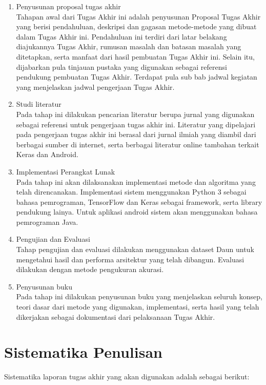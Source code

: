 \begin{enumerate}
\item Penyusunan proposal tugas akhir\\
Tahapan awal dari Tugas Akhir ini adalah penyusunan Proposal Tugas Akhir yang berisi pendahuluan, deskripsi dan gagasan metode-metode yang dibuat dalam Tugas Akhir ini.
Pendahuluan ini terdiri dari latar belakang diajukannya Tugas Akhir, rumusan masalah dan batasan masalah yang ditetapkan, serta manfaat dari hasil pembuatan Tugas Akhir ini. Selain itu, dijabarkan pula tinjauan pustaka yang digunakan sebagai referensi pendukung pembuatan Tugas Akhir. Terdapat pula sub bab jadwal kegiatan yang menjelaskan jadwal pengerjaan Tugas Akhir.
\item Studi literatur\\
Pada tahap ini dilakukan pencarian literatur berupa jurnal yang digunakan sebagai referensi untuk pengerjaan tugas akhir ini. Literatur yang dipelajari pada pengerjaan tugas akhir ini
berasal dari jurnal ilmiah yang diambil dari berbagai sumber di internet, serta berbagai literatur online tambahan terkait Keras dan Android.
\item Implementasi Perangkat Lunak\\
Pada tahap ini akan dilaksanakan implementasi metode dan algoritma yang telah direncanakan. Implementasi sistem menggunakan Python 3 sebagai bahasa pemrograman,
TensorFlow dan Keras sebagai framework, serta library pendukung lainya. Untuk aplikasi android sistem akan menggunakan bahasa pemrograman Java.
\item Pengujian dan Evaluasi\\
Tahap pengujian dan evaluasi dilakukan menggunakan dataset Daun untuk mengetahui hasil dan performa arsitektur yang telah dibangun. Evaluasi dilakukan dengan metode pengukuran akurasi.
\item Penyusunan buku\\
Pada tahap ini dilakukan penyusunan buku yang menjelaskan seluruh konsep, teori dasar dari metode yang digunakan, implementasi, serta hasil yang telah dikerjakan sebagai dokumentasi dari pelaksanaan Tugas Akhir.
\end{enumerate}

\section {Sistematika Penulisan}

Sistematika laporan tugas akhir yang akan digunakan adalah sebagai berikut:

